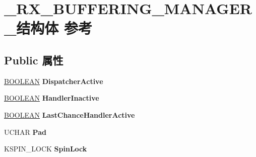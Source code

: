 \hypertarget{struct___r_x___b_u_f_f_e_r_i_n_g___m_a_n_a_g_e_r__}{}\section{\+\_\+\+R\+X\+\_\+\+B\+U\+F\+F\+E\+R\+I\+N\+G\+\_\+\+M\+A\+N\+A\+G\+E\+R\+\_\+结构体 参考}
\label{struct___r_x___b_u_f_f_e_r_i_n_g___m_a_n_a_g_e_r__}
\subsection*{Public 属性}
\begin{DoxyCompactItemize}
\item 
\mbox{\label{struct___r_x___b_u_f_f_e_r_i_n_g___m_a_n_a_g_e_r___a022806f4f5eb345c4f23541e891ad98a}} 
\hyperlink{_processor_bind_8h_a112e3146cb38b6ee95e64d85842e380a}{B\+O\+O\+L\+E\+AN} {\bfseries Dispatcher\+Active}
\item 
\mbox{\label{struct___r_x___b_u_f_f_e_r_i_n_g___m_a_n_a_g_e_r___a0b9d9708a53e0e55e4f779d815ac74d6}} 
\hyperlink{_processor_bind_8h_a112e3146cb38b6ee95e64d85842e380a}{B\+O\+O\+L\+E\+AN} {\bfseries Handler\+Inactive}
\item 
\mbox{\label{struct___r_x___b_u_f_f_e_r_i_n_g___m_a_n_a_g_e_r___ab700b3c4af7c009700e921de73017820}} 
\hyperlink{_processor_bind_8h_a112e3146cb38b6ee95e64d85842e380a}{B\+O\+O\+L\+E\+AN} {\bfseries Last\+Chance\+Handler\+Active}
\item 
\mbox{\label{struct___r_x___b_u_f_f_e_r_i_n_g___m_a_n_a_g_e_r___afe4984a06d47a04760ef0f99625e751e}} 
U\+C\+H\+AR {\bfseries Pad}
\item 
\mbox{\label{struct___r_x___b_u_f_f_e_r_i_n_g___m_a_n_a_g_e_r___af42dfd99c77ae22ac69cdf2570b9950c}} 
K\+S\+P\+I\+N\+\_\+\+L\+O\+CK {\bfseries Spin\+Lock}
\item 
\mbox{\label{struct___r_x___b_u_f_f_e_r_i_n_g___m_a_n_a_g_e_r___ae371c9d84b20a8b380b72e1ac208a784}} 

\end{DoxyCompactItemize}
